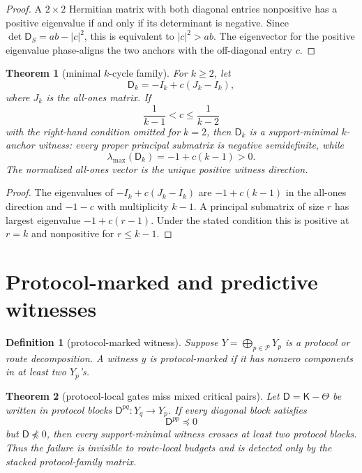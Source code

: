 \documentclass[11pt]{article}
\newtheorem{theorem}{Theorem}
\newtheorem{definition}{Definition}
\newcommand{\K}{\mathsf K}
\newcommand{\Th}{\Theta}
\newcommand{\Def}{\mathsf D}
\begin{document}
\begin{proof}
A $2\times2$ Hermitian matrix with both diagonal entries nonpositive has a positive eigenvalue if and only if its determinant is negative.  Since $\det\Def_S=ab-|c|^2$, this is equivalent to $|c|^2>ab$.  The eigenvector for the positive eigenvalue phase-aligns the two anchors with the off-diagonal entry $c$.
\end{proof}

\begin{theorem}[minimal $k$-cycle family]
For $k\ge2$, let
\[
  \Def_k=-I_k+c(J_k-I_k),
\]
where $J_k$ is the all-ones matrix.  If
\[
  \frac1{k-1}<c\le \frac1{k-2}
\]
with the right-hand condition omitted for $k=2$, then $\Def_k$ is a support-minimal $k$-anchor witness: every proper principal submatrix is negative semidefinite, while
\[
  \lambda_{\max}(\Def_k)=-1+c(k-1)>0.
\]
The normalized all-ones vector is the unique positive witness direction.
\end{theorem}

\begin{proof}
The eigenvalues of $-I_k+c(J_k-I_k)$ are $-1+c(k-1)$ in the all-ones direction and $-1-c$ with multiplicity $k-1$.  A principal submatrix of size $r$ has largest eigenvalue $-1+c(r-1)$.  Under the stated condition this is positive at $r=k$ and nonpositive for $r\le k-1$.
\end{proof}

\section{Protocol-marked and predictive witnesses}

\begin{definition}[protocol-marked witness]
Suppose $Y=\bigoplus_{p\in\mathcal P}Y_p$ is a protocol or route decomposition.  A witness $y$ is protocol-marked if it has nonzero components in at least two $Y_p$'s.
\end{definition}

\begin{theorem}[protocol-local gates miss mixed critical pairs]
Let $\Def=\K-\Th$ be written in protocol blocks $\Def^{pq}:Y_q\to Y_p$.  If every diagonal block satisfies
\[
  \Def^{pp}\preceq0
\]
but $\Def\npreceq0$, then every support-minimal witness crosses at least two protocol blocks.  Thus the failure is invisible to route-local budgets and is detected only by the stacked protocol-family matrix.
\end{theorem}
\end{document}
